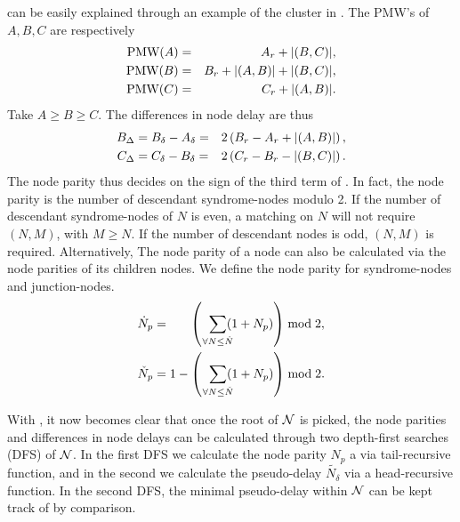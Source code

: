  can be easily explained through an example of the cluster in . The PMW's of $A, B, C$ are respectively 
\begin{eqnarray}
    \nonumber \text{PMW}(A) &=& A_r + \lvert(B, C)\rvert, \\
    \nonumber \text{PMW}(B) &=& B_r + \lvert(A, B)\rvert + \lvert(B, C)\rvert, \\
    \nonumber \text{PMW}(C) &=& C_r + \lvert(A, B)\rvert.
\end{eqnarray}
Take $A\geq B\geq C$. The differences in node delay are thus 
\begin{eqnarray}
    \nonumber B_\Delta &= B_\delta - A_\delta =& 2\left(B_r - A_r + \lvert(A, B)\rvert\right), \\
    \nonumber C_\Delta &= C_\delta - B_\delta =& 2\left(C_r - B_r - \lvert(B, C)\rvert\right).
\end{eqnarray}
The node parity thus decides on the sign of the third term of . In fact, the node parity is the number of descendant syndrome-nodes modulo 2. If the number of descendant syndrome-nodes of $N$ is even, a matching on $N$ will not require $(N,M)$, with $M\geq N$. If the number of descendant nodes is odd, $(N,M)$ is required. Alternatively, The node parity of a node can also be calculated via the node parities of its children nodes. We define the node parity for syndrome-nodes and junction-nodes. 
\begin{align}\label{eq:nodeparity}
    \dot{N}_p &= \hspace{.6cm}\left(\hspace{.2cm} \sum_{\mathclap{\forall N \leq \dot{N}}} (1+N_p) \right ) \bmod 2,\\
    \check{N}_p &= 1 - \left(\hspace{.2cm} \sum_{\mathclap{\forall N \leq \check{N}}} (1+N_p) \right) \bmod 2.
\end{align}


With , it now becomes clear that once the root of $\mathcal{N}$ is picked, the node parities and differences in node delays can be calculated through two depth-first searches (DFS) of $\mathcal{N}$. In the first DFS we calculate the node parity $N_p$ a via tail-recursive function, and in the second we calculate the pseudo-delay $\tilde{N_\delta}$ via a head-recursive function. In the second DFS, the minimal pseudo-delay within $\mathcal{N}$ can be kept track of by comparison. 

